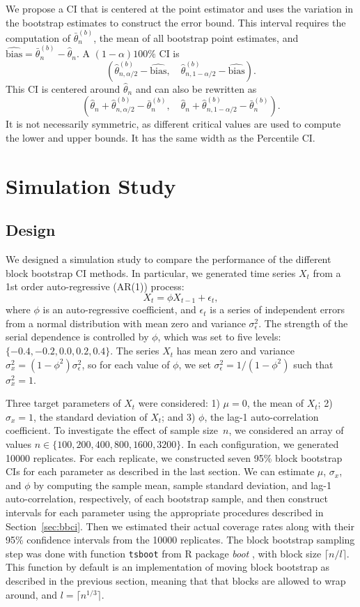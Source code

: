 \documentclass[12pt, letterpaper, titlepage]{article}
\begin{document}
We propose a CI that is centered at the point estimator and uses the variation
in the bootstrap estimates to construct the error bound. This interval requires
the computation of $\bar\theta_n^{(b)}$, the mean of all bootstrap point
estimates, and $\widehat{\text{bias}} = \bar\theta_n^{(b)} - \hat\theta_n$. A
$(1 - \alpha)100\%$ CI is
\[
(\hat\theta_{n, \alpha/2}^{(b)} - \widehat{\text{bias}}, \quad
\hat\theta_{n, 1 - \alpha/2}^{(b)} - \widehat{\text{bias}}).
\]
This CI is centered around $\hat\theta_n$ and can also be rewritten
as 
\[
(\hat\theta_n + \hat\theta_{n, \alpha/2}^{(b)} - \bar\theta_n^{(b)}, \quad
\hat\theta_n + \hat\theta_{n, 1 - \alpha/2}^{(b)} - \bar\theta_n^{(b)}).
\]
It is not necessarily symmetric, as different critical values are used to compute
the lower and upper bounds. It has the same width as the Percentile CI.


\section{Simulation Study}
\label{sec:simu}

\subsection{Design}
We designed a simulation study to compare the performance of the different
block bootstrap CI methods. In particular, we generated time series $X_t$ from
a 1st order auto-regressive (AR(1)) process:
\[
X_t = \phi X_{t-1} + \epsilon_t,
\]
where $\phi$ is an auto-regressive coefficient, and $\epsilon_t$ is a series of
independent errors from a normal distribution with mean zero and variance
$\sigma_{\epsilon}^2$. The strength of the serial dependence is controlled by
$\phi$, which was set to five levels: $\{-0.4, -0.2, 0.0, 0.2, 0.4\}$. The
series $X_t$ has mean zero and variance
$\sigma_x^2 = (1 - \phi^2) \sigma_{\epsilon}^2$, so for each value of $\phi$,
we set $\sigma_{\epsilon}^2 = 1 / (1 - \phi^2)$ such that $\sigma_x^2 = 1$.


Three target parameters of $X_t$ were considered:
1) $\mu = 0$, the mean of $X_t$;
2) $\sigma_x = 1$, the standard deviation of $X_t$; and
3) $\phi$, the lag-1 auto-correlation coefficient.
To investigate the effect of sample size~$n$, we considered an array of values
$n \in \{100, 200, 400, 800, 1600, 3200\}$. In each configuration, we
generated 10000 replicates. For each replicate, we constructed seven 95\% block
bootstrap CIs for each parameter as described in the last section. We can
estimate $\mu$, $\sigma_x$, and $\phi$ by computing the sample mean, sample 
standard deviation, and lag-1 auto-correlation, respectively, of each
bootstrap sample, and then construct intervals for each parameter using the
appropriate procedures described in Section~\ref{sec:bbci}. Then we estimated
their actual coverage rates along with their 95\% confidence intervals from
the 10000 replicates. The block bootstrap sampling step was done with function
\texttt{tsboot} from R package \textsl{boot} \citep{boot}, with block size
$\lceil n / l \rceil$. This function by default is an implementation of moving
block bootstrap as described in the previous section, meaning that that blocks
are allowed to wrap around, and $l = \lceil n^{1/3} \rceil$.
\end{document}
